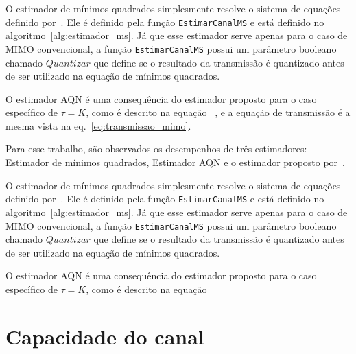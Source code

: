 \documentclass{article}
\begin{document}
O estimador de mínimos quadrados simplesmente resolve o sistema de equações definido por~\cite[eq. 4]{li.etal_2017a}. Ele é definido pela função \texttt{EstimarCanalMS} e está definido no algoritmo~\ref{alg:estimador_ms}. Já que esse estimador serve apenas para o caso de MIMO convencional, a função \texttt{EstimarCanalMS} possui um parâmetro booleano chamado $Quantizar$ que define se o resultado da transmissão é quantizado antes de ser utilizado na equação de mínimos quadrados. 

O estimador AQN é uma consequência do estimador proposto para o caso específico de $\tau=K$, como é descrito na equação~\cite[eq]{li.ets} 
, e a equação de transmissão é a mesma vista na eq.~\eqref{eq:transmissao_mimo}. 

Para esse trabalho, são observados os desempenhos de três estimadores: Estimador de mínimos quadrados, Estimador AQN e o estimador proposto por~\cite{li.etal_2017a}. 

O estimador de mínimos quadrados simplesmente resolve o sistema de equações definido por~\cite[eq. 4]{li.etal_2017a}. Ele é definido pela função \texttt{EstimarCanalMS} e está definido no algoritmo~\ref{alg:estimador_ms}. Já que esse estimador serve apenas para o caso de MIMO convencional, a função \texttt{EstimarCanalMS} possui um parâmetro booleano chamado $Quantizar$ que define se o resultado da transmissão é quantizado antes de ser utilizado na equação de mínimos quadrados. 

O estimador AQN é uma consequência do estimador proposto para o caso específico de $\tau=K$, como é descrito na equação~\cite[eq]{li.ets} 

\section{Capacidade do canal}
\label{sec:capacidade_canal}
\end{document}
